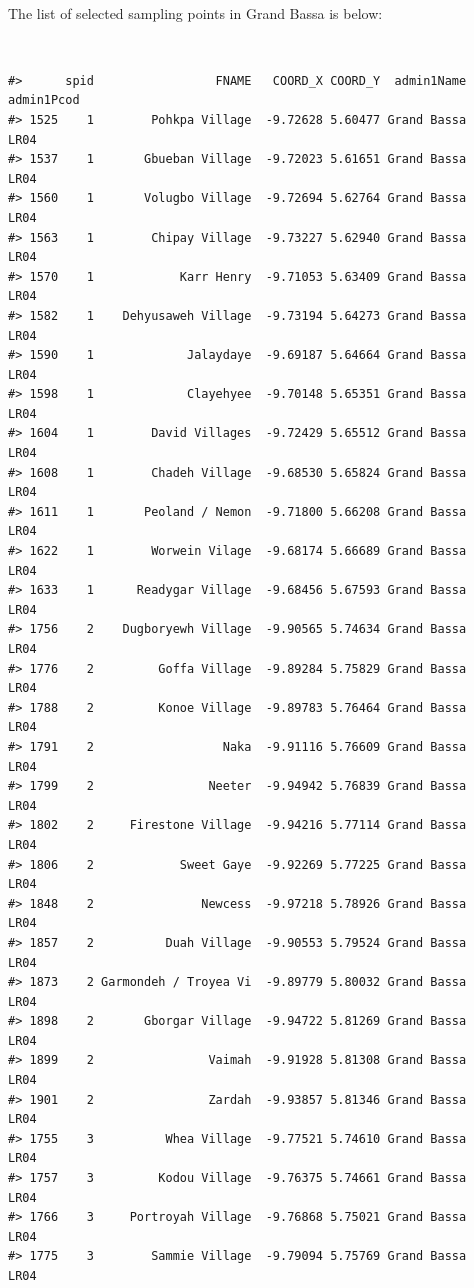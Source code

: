 \documentclass[12pt,a4paper]{book}
\theoremstyle{definition}
\theoremstyle{definition}
\theoremstyle{definition}
\theoremstyle{remark}
\begin{document}
~

The list of selected sampling points in Grand Bassa is below:

~

\begin{verbatim}
#>      spid                 FNAME   COORD_X COORD_Y  admin1Name admin1Pcod
#> 1525    1        Pohkpa Village  -9.72628 5.60477 Grand Bassa       LR04
#> 1537    1       Gbueban Village  -9.72023 5.61651 Grand Bassa       LR04
#> 1560    1       Volugbo Village  -9.72694 5.62764 Grand Bassa       LR04
#> 1563    1        Chipay Village  -9.73227 5.62940 Grand Bassa       LR04
#> 1570    1            Karr Henry  -9.71053 5.63409 Grand Bassa       LR04
#> 1582    1    Dehyusaweh Village  -9.73194 5.64273 Grand Bassa       LR04
#> 1590    1             Jalaydaye  -9.69187 5.64664 Grand Bassa       LR04
#> 1598    1             Clayehyee  -9.70148 5.65351 Grand Bassa       LR04
#> 1604    1        David Villages  -9.72429 5.65512 Grand Bassa       LR04
#> 1608    1        Chadeh Village  -9.68530 5.65824 Grand Bassa       LR04
#> 1611    1       Peoland / Nemon  -9.71800 5.66208 Grand Bassa       LR04
#> 1622    1        Worwein Vilage  -9.68174 5.66689 Grand Bassa       LR04
#> 1633    1      Readygar Village  -9.68456 5.67593 Grand Bassa       LR04
#> 1756    2    Dugboryewh Village  -9.90565 5.74634 Grand Bassa       LR04
#> 1776    2         Goffa Village  -9.89284 5.75829 Grand Bassa       LR04
#> 1788    2         Konoe Village  -9.89783 5.76464 Grand Bassa       LR04
#> 1791    2                  Naka  -9.91116 5.76609 Grand Bassa       LR04
#> 1799    2                Neeter  -9.94942 5.76839 Grand Bassa       LR04
#> 1802    2     Firestone Village  -9.94216 5.77114 Grand Bassa       LR04
#> 1806    2            Sweet Gaye  -9.92269 5.77225 Grand Bassa       LR04
#> 1848    2               Newcess  -9.97218 5.78926 Grand Bassa       LR04
#> 1857    2          Duah Village  -9.90553 5.79524 Grand Bassa       LR04
#> 1873    2 Garmondeh / Troyea Vi  -9.89779 5.80032 Grand Bassa       LR04
#> 1898    2       Gborgar Village  -9.94722 5.81269 Grand Bassa       LR04
#> 1899    2                Vaimah  -9.91928 5.81308 Grand Bassa       LR04
#> 1901    2                Zardah  -9.93857 5.81346 Grand Bassa       LR04
#> 1755    3          Whea Village  -9.77521 5.74610 Grand Bassa       LR04
#> 1757    3         Kodou Village  -9.76375 5.74661 Grand Bassa       LR04
#> 1766    3     Portroyah Village  -9.76868 5.75021 Grand Bassa       LR04
#> 1775    3        Sammie Village  -9.79094 5.75769 Grand Bassa       LR04

\end{verbatim}
\end{document}
